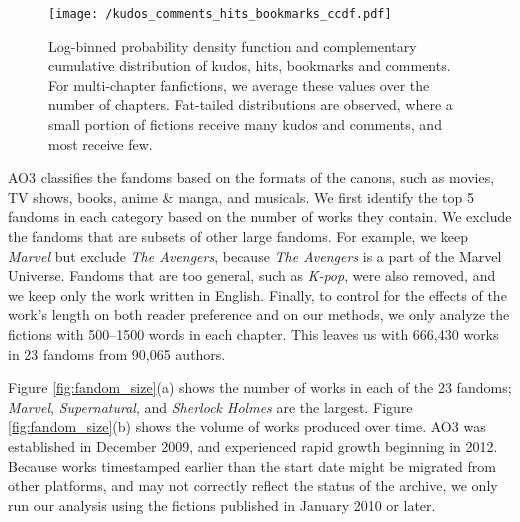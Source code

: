\documentclass[letterpaper]{article} %
\begin{document}
    
\begin{figure*}
    \centering
       \texttt{[image: /kudos\_comments\_hits\_bookmarks\_ccdf.pdf]}
        \caption{Log-binned probability density function and complementary cumulative distribution of kudos, hits, bookmarks and comments. For multi-chapter fanfictions, we average these values over the number of chapters. Fat-tailed distributions are observed, where a small portion of fictions receive many kudos and comments, and most receive few.}
        \label{fig:kudos_dist}
    \end{figure*}

AO3 classifies the fandoms based on the formats of the canons, such as movies, TV shows, books, anime \& manga, and musicals. We first identify the top 5 fandoms in each category based on the number of works they contain. We exclude the fandoms that are subsets of other large fandoms. For example, we keep \emph{Marvel} but exclude \emph{The Avengers}, because \emph{The Avengers} is a part of the Marvel Universe. Fandoms that are too general, such as \emph{K-pop}, were also removed, and we keep only the work written in English. Finally, to control for the effects of the work's length on both reader preference and on our methods, we only analyze the fictions with 500--1500 words in each chapter. This leaves us with 666,430 works in 23 fandoms from 90,065 authors.

Figure \ref{fig:fandom_size}(a) shows the number of works in each of the 23 fandoms; \emph{Marvel}, \emph{Supernatural}, and \emph{Sherlock Holmes} are the largest. Figure \ref{fig:fandom_size}(b) shows the volume of works produced over time. AO3 was established in December 2009, and experienced rapid growth beginning in 2012. Because works timestamped earlier than the start date might be migrated from other platforms, and may not correctly reflect the status of the archive, we only run our analysis using the fictions published in January 2010 or later.
\end{document}
